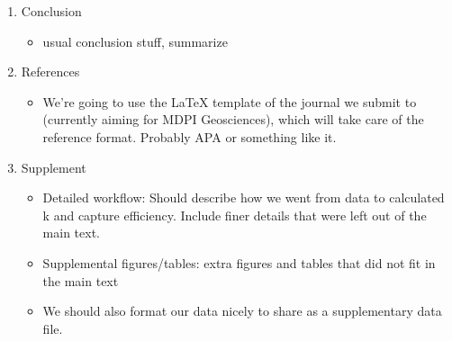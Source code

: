 \documentclass{scrreprt}
\begin{document}
\begin{enumerate}
    \item Conclusion
    \begin{itemize}
        \item usual conclusion stuff, summarize
    \end{itemize}
    
    \item References
    \begin{itemize}
        \item We're going to use the LaTeX template of the journal we submit to (currently aiming for MDPI Geosciences), which will take care of the reference format. Probably APA or something like it.
    \end{itemize}
    
    \item Supplement
    \begin{itemize}
        \item Detailed workflow: Should describe how we went from data to calculated k and capture efficiency. Include finer details that were left out of the main text.
        \item Supplemental figures/tables: extra figures and tables that did not fit in the main text
        \item We should also format our data nicely to share as a supplementary data file.
    \end{itemize}
    
\end{enumerate}
\end{document}
